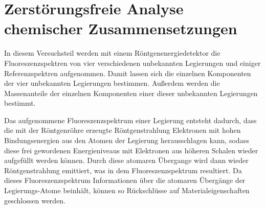 \section{Zerstörungsfreie Analyse chemischer Zusammensetzungen}\label{sec:materialanalyse}
In diesem Versuchsteil werden mit einem Röntgenenergiedetektor die Fluoreszenzspektren von vier verschiedenen unbekannten Legierungen
und einiger Referenzspektren aufgenommen. Damit lassen sich die einzelnen Komponenten der vier unbekannten Legierungen bestimmen.
Außerdem werden die Massenanteile der einzelnen Komponenten einer dieser unbekannten Legierungen bestimmt.\par
Das aufgenommene Fluoreszenzspektrum einer Legierung entsteht dadurch, dass die mit der Röntgenröhre erzeugte Röntgenstrahlung
Elektronen mit hohen Bindungsenergien aus den Atomen der Legierung herausschlagen kann, sodass diese frei gewordenen Energieniveaus mit
Elektronen aus höheren Schalen wieder aufgefüllt werden können. Durch diese atomaren Übergange wird dann wieder Röntgenstrahlung
emittiert, was in dem Fluoreszenzspektrum resultiert. Da dieses Fluoreszenzspektrum Informationen über die atomaren Übergänge
der Legierungs-Atome beinhält, können so Rückschlüsse auf Materialeigenschaften geschlossen werden.
